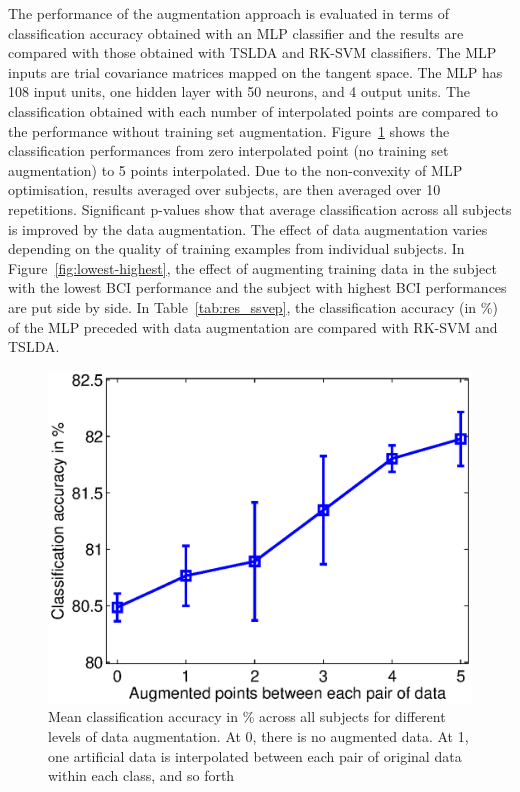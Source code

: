 The performance of the augmentation approach is evaluated in terms of classification accuracy obtained with an MLP classifier and the results are compared with those obtained with TSLDA and RK-SVM classifiers. 
The MLP inputs are trial covariance matrices mapped on the tangent space. 
The MLP has 108 input units, one hidden layer with 50 neurons, and 4 output units.
The classification obtained with each number of interpolated points are compared to the performance without training set augmentation. 
Figure~\ref{fig:ssvep-mean} shows the classification performances from zero interpolated point (no training set augmentation) to 5 points interpolated. Due to the non-convexity of MLP optimisation, results averaged over subjects, are then averaged over 10 repetitions.
Significant p-values show that average classification across all subjects is improved by the data augmentation. %
The effect of data augmentation varies depending on the quality of training examples from individual subjects. 
In Figure~\ref{fig:lowest-highest}, the effect of augmenting training data in the subject with the lowest BCI performance and the subject with highest BCI performances are put side by side. 
In Table~\ref{tab:res_ssvep}, the classification accuracy (in \%) of the MLP preceded with data augmentation are compared with RK-SVM and TSLDA.

\begin{figure}[ht!]
\vskip 0.2in
\begin{center}
\centerline{\includegraphics[width=0.95\columnwidth]{Figures/ssvep_mean.eps}}
\caption{Mean classification accuracy in \% across all subjects for different levels of data augmentation. At 0, there is no augmented data. At 1, one artificial data is interpolated between each pair of original data within each class, and so forth}
\label{fig:ssvep-mean}
\end{center}
\vskip -0.2in
\end{figure} 

